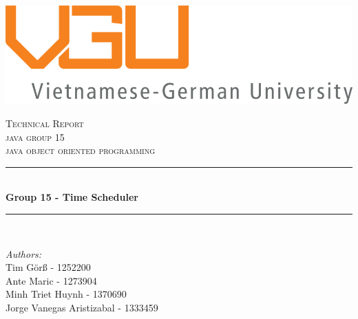 \begin{titlepage}

\newcommand{\HRule}{\rule{\linewidth}{0.5mm}} %

\centering
\includegraphics{./title/Logo20.png}


 

\center %


\textsc{\LARGE Technical Report}\\[1.5cm] 
\textsc{\Large java group 15}\\[0.5cm] 
\textsc{\large java object oriented programming}\\[0.5cm] 

\makeatletter
\HRule \\[0.4cm]
{ \huge \bfseries Group 15 - Time Scheduler }\\[0.4cm] %
\HRule \\[1.5cm]
 

\begin{minipage}{0.5\textwidth}
\begin{flushleft} \large
\emph{Authors:}\\
Tim Görß                  - 1252200\\
Ante Maric                - 1273904\\
Minh Triet Huynh          - 1370690\\
Jorge Vanegas Aristizabal - 1333459\\


\end{flushleft}
\end{minipage}
\end{titlepage}
